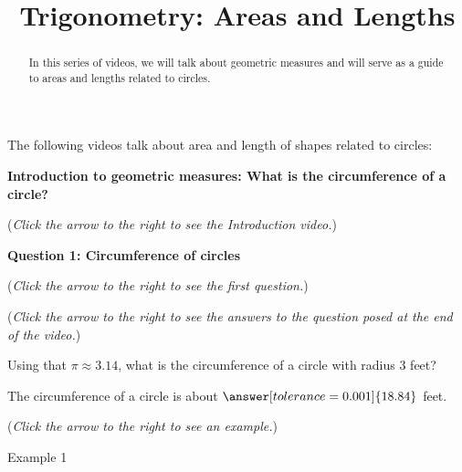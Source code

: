 \documentclass{ximera}
\title[Prerequisite Videos: ]{Trigonometry: Areas and Lengths}
\begin{document}
\begin{abstract}
  In this series of videos, we will talk about geometric measures and will
  serve as a guide to areas and lengths related to circles.
\end{abstract}
\maketitle

The following videos talk about area and length of shapes related to circles:

\textbf{Introduction to geometric measures: What is the circumference
of a circle?}
\begin{exercise}
\begin{flushright}
{\color{blue}(\emph{Click the arrow to the right to see the Introduction video.})}
\end{flushright}
\begin{center}
\begin{expandable}
\end{expandable}
\end{center}
\end{exercise}

\textbf{Question 1: Circumference of circles}
\begin{question}
\begin{flushright}
{\color{blue}(\emph{Click the arrow to the right to see the first question.})}
\end{flushright}
\begin{center}
\begin{expandable}
{\color{blue}(\emph{Click the arrow to the right to see the answers 
to the question posed at the end of the video.})}
\begin{expandable}
Using that $\pi\approx 3.14$, what is the circumference of a circle with radius $3$ feet?\\
\begin{prompt}
The circumference of a circle is about $\answer[tolerance=0.001]{18.84}$ feet.
\end{prompt}
\begin{flushright}
{\color{blue}(\emph{Click the arrow to the right to see an example.})}
\end{flushright}
\begin{expandable}
Example 1
\end{expandable}
\end{expandable}
\end{expandable}
\end{center}
\end{question}
\end{document}
